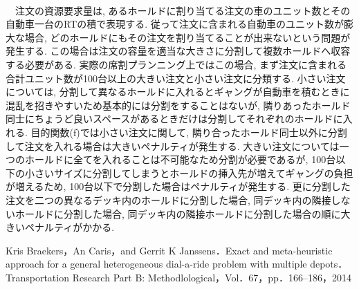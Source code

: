 \documentclass[a4j,11pt,twocolumn]{jsarticle}
\begin{document}
 \\
　注文の資源要求量は, あるホールドに割り当てる注文の車のユニット数とその自動車一台のRTの積で表現する. 従って注文に含まれる自動車のユニット数が膨大な場合, どのホールドにもその注文を割り当てることが出来ないという問題が発生する. この場合は注文の容量を適当な大きさに分割して複数ホールドへ収容する必要がある. 実際の席割プランニング上ではこの場合, まず注文に含まれる合計ユニット数が100台以上の大きい注文と小さい注文に分類する. 小さい注文については, 分割して異なるホールドに入れるとギャングが自動車を積むときに混乱を招きやすいため基本的には分割をすることはないが, 隣りあったホールド同士にちょうど良いスペースがあるときだけは分割してそれぞれのホールドに入れる. 目的関数(f)では小さい注文に関して, 隣り合ったホールド同士以外に分割して注文を入れる場合は大きいペナルティが発生する. 大きい注文については一つのホールドに全てを入れることは不可能なため分割が必要であるが,  100台以下の小さいサイズに分割してしまうとホールドの挿入先が増えてギャングの負担が増えるため, 100台以下で分割した場合はペナルティが発生する. 更に分割した注文を二つの異なるデッキ内のホールドに分割した場合, 同デッキ内の隣接しないホールドに分割した場合, 同デッキ内の隣接ホールドに分割した場合の順に大きいペナルティがかかる. \\

\begin{thebibliography}{99}
   Kris Braekers，An Caris，and Gerrit K Janssens．Exact and meta-heuristic approach for a general heterogeneous dial-a-ride problem with multiple depots．Transportation Research Part B: Methodlological，Vol．67，pp．166--186，2014
\end{thebibliography}
\end{document}
